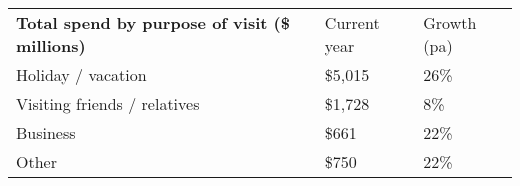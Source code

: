 \begin{tabular}[t]{p{4.85cm}>{\hfill}p{1.3cm}>{\hfill}p{1.35cm}}
 \textbf{Total spend by purpose of visit (\$ millions)} & Current year & Growth (pa) \\ 
 Holiday / vacation & \$5,015 & 26\% \\ 
  Visiting friends / relatives & \$1,728 & 8\% \\ 
  Business & \$661   & 22\% \\ 
  Other & \$750 & 22\% \\ 
  \end{tabular}
